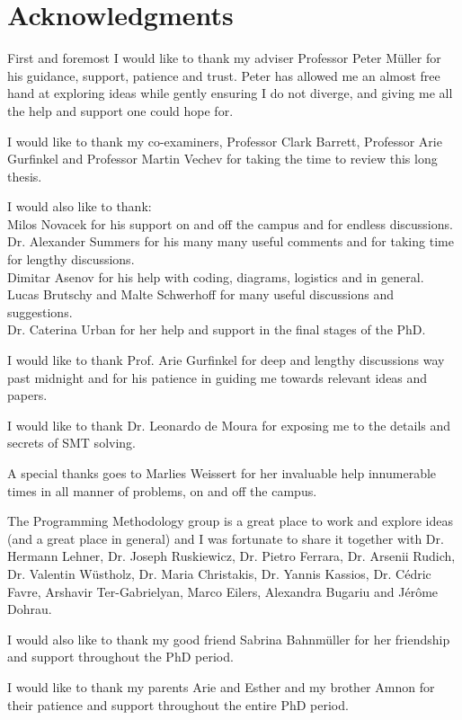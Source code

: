 \chapter*{Acknowledgments}

First and foremost I would like to thank my adviser Professor Peter M{\"u}ller for his guidance, support, patience and trust. Peter has allowed me an almost free hand at exploring ideas while gently ensuring I do not diverge, and giving me all the help and support one could hope for.

I would like to thank my co-examiners, Professor Clark Barrett, Professor Arie Gurfinkel and Professor Martin Vechev for taking the time to review this long thesis.

I would also like to thank:\\
Milos Novacek for his support on and off the campus and for endless discussions.\\
Dr. Alexander Summers for his many many useful comments and for taking time for lengthy discussions.\\
Dimitar Asenov for his help with coding, diagrams, logistics and in general.\\
Lucas Brutschy and Malte Schwerhoff for many useful discussions and suggestions.\\
Dr. Caterina Urban for her help and support in the final stages of the PhD.

I would like to thank Prof. Arie Gurfinkel for deep and lengthy discussions way past midnight and for his patience in guiding me towards relevant ideas and papers.

I would like to thank Dr. Leonardo de Moura for exposing me to the details and secrets of SMT solving.

A special thanks goes to Marlies Weissert for her invaluable help innumerable times in all manner of problems, on and off the campus.

The Programming Methodology group is a great place to work and explore ideas (and a great place in general) and I was fortunate to share it together with Dr. Hermann Lehner, Dr. Joseph Ruskiewicz, Dr. Pietro Ferrara, Dr. Arsenii Rudich, Dr. Valentin W{\"u}stholz, Dr. Maria Christakis, Dr. Yannis Kassios, Dr. C\'{e}dric Favre, Arshavir Ter-Gabrielyan, Marco Eilers, Alexandra Bugariu and J\'{e}r\^{o}me Dohrau.

I would also like to thank my good friend Sabrina Bahnm{\"u}ller for her friendship and support throughout the PhD period.

I would like to thank my parents Arie and Esther and my brother Amnon for their patience and support throughout the entire PhD period.




\newpage
